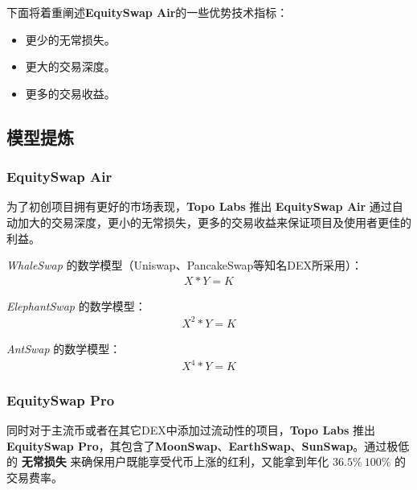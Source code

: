 \documentclass{article}
\begin{document}
下面将着重阐述\textbf{EquitySwap Air}的一些优势技术指标：

\begin{itemize}
  \item 更少的无常损失。
  \item 更大的交易深度。
  \item 更多的交易收益。
\end{itemize}

\subsection{模型提炼}

\subsubsection*{EquitySwap Air}

为了初创项目拥有更好的市场表现，\textbf{Topo Labs} 推出 \textbf{EquitySwap Air} 通过自动加大的交易深度，更小的无常损失，更多的交易收益来保证项目及使用者更佳的利益。

\emph{WhaleSwap} 的数学模型（Uniswap、PancakeSwap等知名DEX所采用）：
\begin{equation} \label{whale_swap}
\begin{split}
X * Y = K
\end{split}
\end{equation}

\emph{ElephantSwap} 的数学模型：
\begin{equation} \label{elephant_swap}
\begin{split}
X^2 * Y = K
\end{split}
\end{equation}

\emph{AntSwap} 的数学模型：
\begin{equation} \label{ant_swap}
\begin{split}
X^4 * Y = K
\end{split}
\end{equation}

\subsubsection*{EquitySwap Pro}

同时对于主流币或者在其它DEX中添加过流动性的项目，\textbf{Topo Labs} 推出 \textbf{EquitySwap Pro}，其包含了\textbf{MoonSwap}、\textbf{EarthSwap}、\textbf{SunSwap}。通过极低的 \textbf{无常损失} 来确保用户既能享受代币上涨的红利，又能拿到年化 $36.5\% ~ 100\%$ 的交易费率。
\end{document}
